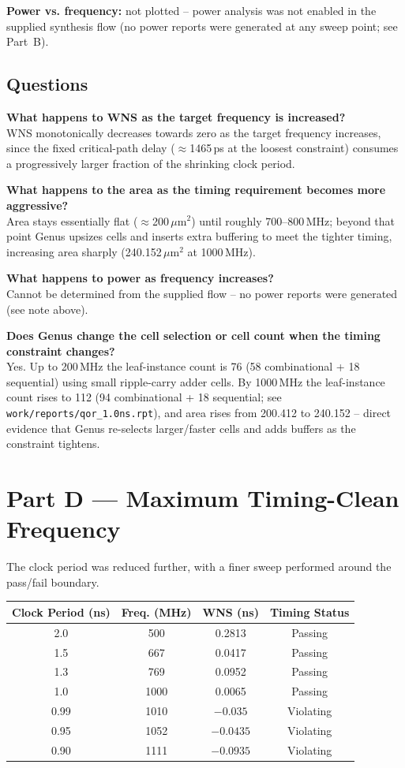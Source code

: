\documentclass[11pt]{article}
\begin{document}
\noindent\textbf{Power vs. frequency:} not plotted -- power analysis was not enabled in the
supplied synthesis flow (no power reports were generated at any sweep point; see Part~B).

\subsection*{Questions}
\textbf{What happens to WNS as the target frequency is increased?}\\
WNS monotonically decreases towards zero as the target frequency increases, since the fixed
critical-path delay ($\approx$1465\,ps at the loosest constraint) consumes a progressively larger
fraction of the shrinking clock period.

\textbf{What happens to the area as the timing requirement becomes more aggressive?}\\
Area stays essentially flat ($\approx$200\,$\mu$m$^2$) until roughly 700--800\,MHz; beyond that
point Genus upsizes cells and inserts extra buffering to meet the tighter timing, increasing area
sharply (240.152\,$\mu$m$^2$ at 1000\,MHz).

\textbf{What happens to power as frequency increases?}\\
Cannot be determined from the supplied flow -- no power reports were generated (see note above).

\textbf{Does Genus change the cell selection or cell count when the timing constraint changes?}\\
Yes. Up to 200\,MHz the leaf-instance count is 76 (58 combinational + 18 sequential) using small
ripple-carry adder cells. By 1000\,MHz the leaf-instance count rises to 112 (94 combinational + 18
sequential; see \texttt{work/reports/qor\_1.0ns.rpt}), and area rises from 200.412 to 240.152 --
direct evidence that Genus re-selects larger/faster cells and adds buffers as the constraint
tightens.

\section{Part D --- Maximum Timing-Clean Frequency}
The clock period was reduced further, with a finer sweep performed around the pass/fail boundary.

\begin{center}
\begin{tabular}{|c|c|c|c|}
\hline
\textbf{Clock Period (ns)} & \textbf{Freq. (MHz)} & \textbf{WNS (ns)} & \textbf{Timing Status} \\ \hline
2.0  & 500  & 0.2813  & Passing \\ \hline
1.5  & 667  & 0.0417  & Passing \\ \hline
1.3  & 769  & 0.0952  & Passing \\ \hline
1.0  & 1000 & 0.0065  & Passing \\ \hline
0.99 & 1010 & $-0.035$  & Violating \\ \hline
0.95 & 1052 & $-0.0435$ & Violating \\ \hline
0.90 & 1111 & $-0.0935$ & Violating \\ \hline
\end{tabular}
\end{center}
\end{document}
